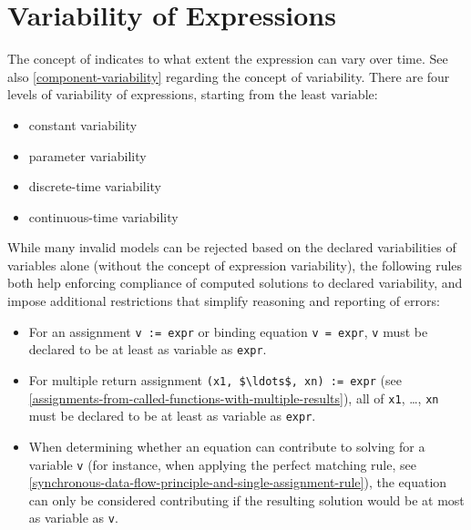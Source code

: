\section{Variability of Expressions}\label{variability-of-expressions}

The concept of  indicates to what extent the expression can vary over time.
See also \cref{component-variability} regarding the concept of variability.
There are four levels of variability of expressions, starting from the least variable:
\begin{itemize}
\item
  constant variability
\item
  parameter variability
\item
  discrete-time variability
\item
  continuous-time variability
\end{itemize}

While many invalid models can be rejected based on the declared variabilities of variables alone (without the concept of expression variability), the following rules both help enforcing compliance of computed solutions to declared variability, and impose additional restrictions that simplify reasoning and reporting of errors:
\begin{itemize}
\item
  For an assignment \lstinline!v := expr! or binding equation \lstinline!v = expr!, \lstinline!v! must be declared to be at least as variable as \lstinline!expr!.
\item
  For multiple return assignment \lstinline!(x1, $\ldots$, xn) := expr! (see \cref{assignments-from-called-functions-with-multiple-results}), all of \lstinline!x1!, \ldots, \lstinline!xn! must be declared to be at least as variable as \lstinline!expr!.
\item
  When determining whether an equation can contribute to solving for a variable \lstinline!v! (for instance, when applying the perfect matching rule, see \cref{synchronous-data-flow-principle-and-single-assignment-rule}), the equation can only be considered contributing if the resulting solution would be at most as variable as \lstinline!v!.
\end{itemize}


